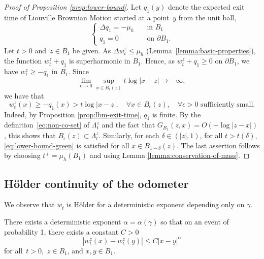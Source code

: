 \documentclass[12pt]{amsart}
\numberwithin{equation}{section}
\newcommand{\lss}[2]{\hyperref[eq:least-super-solution]{w^{#1}_{#2}}}
\newcommand{\cluster}[2]{\hyperref[eq:non-co-set]{\mathit{\Lambda}^{#1}_{#2}}}
\begin{document}
	\begin{proof}[Proof of Proposition \ref{prop:lower-bound}]
		
		Let $q_1(y)$ denote the expected exit time of Liouville Brownian Motion started at a point~$y$ from the unit ball, 		
		\[
		\begin{cases}
		\Delta q_1 = -\mu_h \quad &\mbox{in $B_1$} \\
		q_1 = 0 \quad &\mbox{on $\partial B_1$}.
		\end{cases}
		\]
		Let $t > 0$ and~$z \in B_1$ be given. 
		As $\Delta \lss{z}{t} \leq \mu_h$ (Lemma~\ref{lemma:basic-properties}), the function $\lss{z}{t} + q_{1}$ is superharmonic in $B_1$. Hence, as $\lss{z}{t} + q_1 \geq 0$ on $\partial B_1$, we have $\lss{z}{t} \geq -q_{1} $ 
		in $\overline{B_1}$. Since
		\[
		\lim_{\epsilon \to 0} \sup_{x \in B_{\epsilon}(z)} t \log |x-z| \to -\infty,
		\]
		we have that
		\begin{equation} \label{eq:lower-bound-green}
		\lss{z}{t}(x) \geq  -q_{1}(x) > t \log |x-z|, \quad \forall x \in B_{\epsilon}(z), \quad \forall \epsilon > 0 \mbox{ sufficiently small}.
		\end{equation}
		Indeed, by Proposition \ref{prop:lbm-exit-time}, $q_{1}$ is finite. By the definition~\eqref{eq:non-co-set} of ${\cluster{z}{t}}$ and the fact that $G_{B_1}(z,x) = O(-\log|z-x|)$, this shows that $B_{\epsilon}(z) \subset {\cluster{z}{t}}$. 	Similarly, for each $\delta \in (|z|,1)$, for all $t > t(\delta)$, \eqref{eq:lower-bound-green}
		is satisfied for all $x \in B_{1-\delta}(z)$. 	The last assertion follows by choosing $t^+ = \mu_h(B_1)$
		and using Lemma \ref{lemma:conservation-of-mass}.
	\end{proof}
	
	
	\subsection{H\"{o}lder continuity of the odometer}
	We observe that $\lss{}{t}$ is H\"{o}lder for a deterministic exponent depending only on $\gamma$. 
	
	
	
	\begin{lemma} \label{odometer:cont}
		There exists a deterministic exponent $\alpha = \alpha(\gamma)$ so that on an event of probability 1, there
		exists a constant $C > 0$
		\[
		|\lss{z}{t}(x) - \lss{z}{t}(y)| \leq C |x-y|^{\alpha}
		\]
		for all~$t > 0$,~$z \in B_1$, and $x,y \in B_1$. 
	\end{lemma}
	
\end{document}
